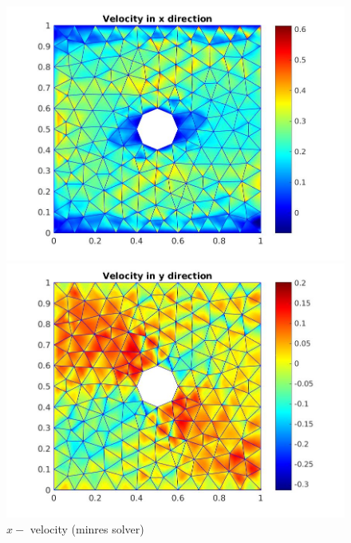 \documentclass[a4paper]{book}
\begin{document}
\begin{figure}
  \begin{minipage}[c]{0.67\textwidth}
    \includegraphics[width=\textwidth]{cylinder_minres_vx.jpg}
  \end{minipage}\hfill
  \begin{minipage}[c]{0.3\textwidth}
    \caption{$x-$ velocity (minres solver)}
    \label{x_vel_stoke_minres}
  \end{minipage}
  \begin{minipage}[c]{0.67\textwidth}
    \includegraphics[width=\textwidth]{cylinder_minres_vy.jpg}
  \end{minipage}\hfill
  \begin{minipage}[c]{0.3\textwidth}

\end{minipage}
\end{figure}
\end{document}
